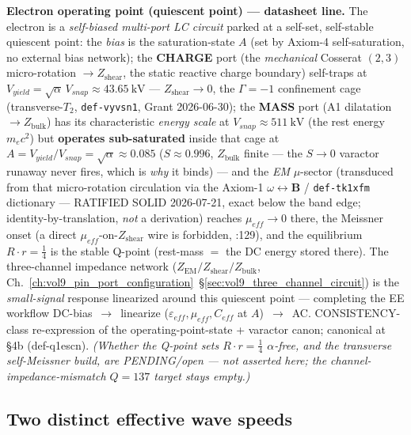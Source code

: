 \noindent
\textbf{Electron operating point (quiescent point) --- datasheet line.} The electron is a \emph{self-biased multi-port LC circuit} parked at a self-set, self-stable quiescent point: the \emph{bias} is the saturation-state $A$ (set by Axiom-4 self-saturation, no external bias network); the \textbf{CHARGE} port (the \emph{mechanical} Cosserat $(2,3)$ micro-rotation $\to Z_{\mathrm{shear}}$, the static reactive charge boundary) self-traps at $V_{yield} = \sqrt{\alpha}\,V_{snap} \approx \qty{43.65}{\kilo\volt}$ --- $Z_{\mathrm{shear}} \to 0$, the $\Gamma = -1$\gammaundeclared{} confinement cage (transverse-$T_2$, \texttt{def-vyvsn1}, Grant 2026-06-30); the \textbf{MASS} port (A1 dilatation $\to Z_{\mathrm{bulk}}$) has its characteristic \emph{energy scale} at $V_{snap} \approx \qty{511}{\kilo\volt}$ (the rest energy $m_e c^2$) but \textbf{operates sub-saturated} inside that cage at $A = V_{yield}/V_{snap} = \sqrt{\alpha} \approx 0.085$ ($S \approx 0.996$, $Z_{\mathrm{bulk}}$ finite --- the $S \to 0$ varactor runaway never fires, which is \emph{why} it binds) --- and the \emph{EM} $\mu$-sector (transduced from that micro-rotation circulation via the Axiom-1 $\omega\!\leftrightarrow\!\mathbf{B}$ / \texttt{def-tk1xfm} dictionary --- RATIFIED SOLID 2026-07-21, exact below the band edge; identity-by-translation, \emph{not} a derivation) reaches $\mu_{eff}\to0$ there, the Meissner onset (a direct $\mu_{eff}$-on-$Z_{\mathrm{shear}}$ wire is forbidden, :129), and the equilibrium $R \cdot r = \tfrac14$ is the stable Q-point (rest-mass $=$ the DC energy stored there). The three-channel impedance network ($Z_{\mathrm{EM}}/Z_{\mathrm{shear}}/Z_{\mathrm{bulk}}$, Ch.~\ref{ch:vol9_pin_port_configuration}~\S\ref{sec:vol9_three_channel_circuit}) is the \emph{small-signal} response linearized around this quiescent point --- completing the EE workflow DC-bias~$\to$~linearize ($\varepsilon_{eff},\mu_{eff},C_{eff}$ at $A$)~$\to$~AC. CONSISTENCY-class re-expression of the operating-point-state + varactor canon; canonical at  \S 4b (def-q1escn). \emph{(Whether the Q-point sets $R \cdot r = \tfrac14$ $\alpha$-free, and the transverse self-Meissner build, are PENDING/open --- not asserted here; the channel-impedance-mismatch $Q = 137$ target stays empty.)}

\subsection{Two distinct effective wave speeds}
\label{sec:vol9_two_wave_speeds}

